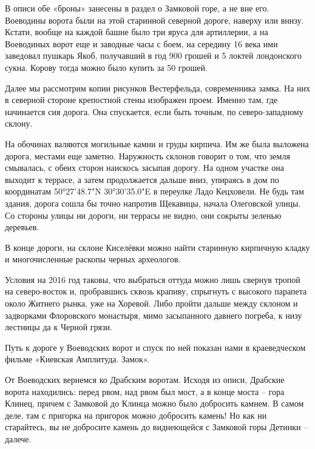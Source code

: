 В описи обе «броны» занесены в раздел о Замковой горе, а не вне его. Воеводины ворота были на этой старинной северной дороге, наверху или внизу. Кстати, вообще на каждой башне было три яруса для артиллерии, а на Воеводиных ворот еще и заводные часы с боем, на середину 16 века ими заведовал пушкарь Якоб, получавший в год 900 грошей и 5 локтей лондонского сукна. Корову тогда можно было купить за 50 грошей.

Далее мы рассмотрим копии рисунков Вестерфельда, современника замка. На них в северной стороне крепостной стены изображен проем. Именно там, где начинается сия дорога. Она спускается, если быть точным, по северо-западному склону.

На обочинах валяются могильные камни и груды кирпича. Им же была выложена дорога, местами еще заметно. Наружность склонов говорит о том, что земля смывалась, с обеих сторон наискось засыпая дорогу. На одном участке она выходит к террасе, а затем продолжается дальше вниз, упираясь в дом по координатам 50°27'48.7"N 30°30'35.0"E в переулке Ладо Кецховели. Не будь там здания, дорога сошла бы точно напротив Щекавицы, начала Олеговской улицы. Со стороны улицы ни дороги, ни террасы не видно, они сокрыты зеленью деревьев.

В конце дороги, на склоне Киселёвки можно найти старинную кирпичную кладку и многочисленные раскопы черных археологов. 

Условия на 2016 год таковы, что выбраться оттуда можно лишь свернув тропой на северо-восток и, пробравшись сквозь крапиву, спрыгнуть с высокого парапета около Житнего рынка, уже на Хоревой. Либо пройти дальше между склоном и задворками Флоровского монастыря, мимо засыпанного давнего погреба, к низу лестницы да к Черной грязи.

Путь к дороге у Воеводских ворот и спуск по ней показан нами в краеведческом фильме «Киевская Амплитуда. Замок».


От Воеводских вернемся ко Драбским воротам. Исходя из описи, Драбские ворота находились: перед рвом, над рвом был мост, а в конце моста – гора Клинец, причем с Замковой до Клинца можно было добросить камнем. В самом деле, там с пригорка на пригорок можно добросить камень! Но как ни старайтесь, вы не добросите камень до виднеющейся с Замковой горы Детинки – далече.

